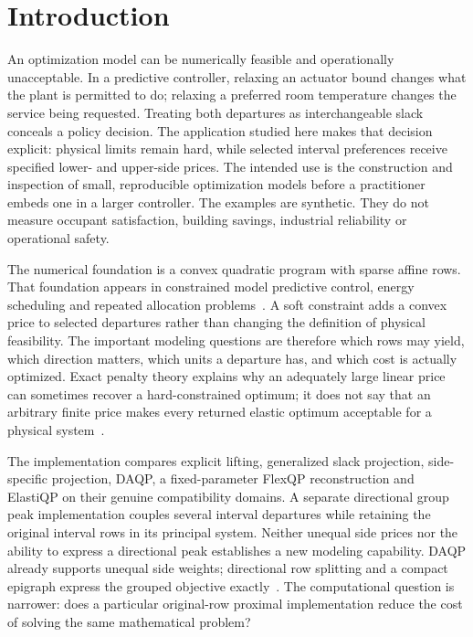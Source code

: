 \section{Introduction}\label{sec:introduction}
An optimization model can be numerically feasible and operationally unacceptable.
In a predictive controller, relaxing an actuator bound changes what the plant is
permitted to do; relaxing a preferred room temperature changes the service being
requested. Treating both departures as interchangeable slack conceals a policy
decision. The application studied here makes that decision explicit: physical
limits remain hard, while selected interval preferences receive specified lower-
and upper-side prices. The intended use is the construction and inspection of
small, reproducible optimization models before a practitioner embeds one in a
larger controller. The examples are synthetic. They do not measure occupant
satisfaction, building savings, industrial reliability or operational safety.

The numerical foundation is a convex quadratic program with sparse affine rows.
That foundation appears in constrained model predictive control, energy scheduling
and repeated allocation problems~\cite{rawlings,mayne,mayne}. A soft constraint
adds a convex price to selected departures rather than changing the definition of
physical feasibility. The important modeling questions are therefore which rows
may yield, which direction matters, which units a departure has, and which cost
is actually optimized. Exact penalty theory explains why an adequately large
linear price can sometimes recover a hard-constrained optimum; it does not say
that an arbitrary finite price makes every returned elastic optimum acceptable
for a physical system~\cite{kerrigan,nocedal}.

The implementation compares explicit lifting, generalized slack projection,
side-specific projection, DAQP, a fixed-parameter FlexQP reconstruction and
ElastiQP on their genuine compatibility domains. A separate directional group
peak implementation couples several interval departures while retaining the
original interval rows in its principal system. Neither unequal side prices nor
the ability to express a directional peak establishes a new modeling capability.
DAQP already supports unequal side weights; directional row splitting and a
compact epigraph express the grouped objective exactly~\cite{daqp,gsp,elasti}.
The computational question is narrower: does a particular original-row proximal
implementation reduce the cost of solving the same mathematical problem?

